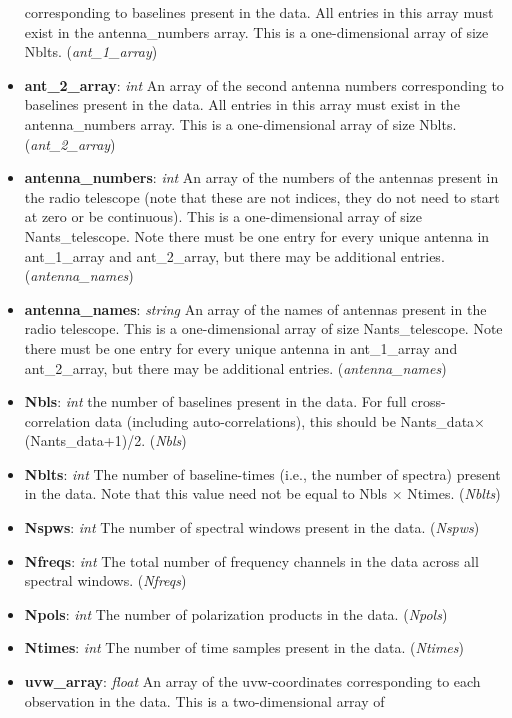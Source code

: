 \documentclass[11pt, oneside]{article}
\begin{document}
\begin{itemize}
  corresponding to baselines present in the data. All entries in this array must exist
  in the antenna\_numbers array. This is a one-dimensional
  array of size Nblts. (\textit{ant\_1\_array})
\item \textbf{ant\_2\_array}: \textit{int} An array of the second antenna numbers
  corresponding to baselines present in the data. All entries in this array must exist
  in the antenna\_numbers array. This is a one-dimensional
  array of size Nblts. (\textit{ant\_2\_array})
\item \textbf{antenna\_numbers}: \textit{int} An array of the numbers of the antennas
  present in the radio telescope (note that these are not indices, they do not need to start at zero
  or be continuous). This is a one-dimensional array of size
  Nants\_telescope. Note there must be one entry for every unique antenna in
  ant\_1\_array and ant\_2\_array, but there may be additional
  entries. (\textit{antenna\_names})
\item \textbf{antenna\_names}: \textit{string} An array of the names of antennas
  present in the radio telescope. This is a one-dimensional array of size
  Nants\_telescope. Note there must be one entry for every unique antenna in
  ant\_1\_array and ant\_2\_array, but there may be additional
  entries. (\textit{antenna\_names})
\item \textbf{Nbls}: \textit{int} the number of baselines present in the
  data. For full cross-correlation data (including auto-correlations), this
  should be Nants\_data$\times$(Nants\_data+1)/2. (\textit{Nbls})
\item \textbf{Nblts}: \textit{int} The number of baseline-times (i.e., the
  number of spectra) present in the data. Note that this value need not be equal
  to Nbls $\times$ Ntimes. (\textit{Nblts})
\item \textbf{Nspws}: \textit{int} The number of spectral windows present in the
  data. (\textit{Nspws})
\item \textbf{Nfreqs}: \textit{int} The total number of frequency channels in
  the data across all spectral windows. (\textit{Nfreqs})
\item \textbf{Npols}: \textit{int} The number of polarization products in the
  data. (\textit{Npols})
\item \textbf{Ntimes}: \textit{int} The number of time samples present in the
  data. (\textit{Ntimes})
\item \textbf{uvw\_array}: \textit{float} An array of the uvw-coordinates
  corresponding to each observation in the data. This is a two-dimensional array of

\end{itemize}
\end{document}
